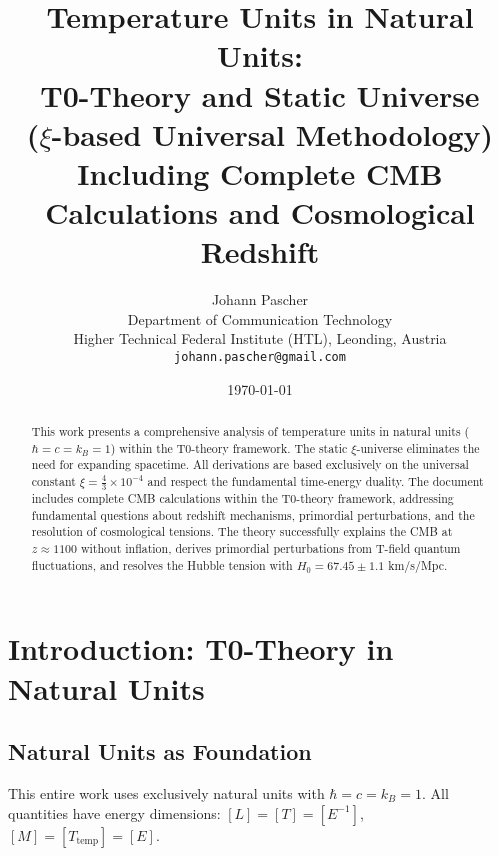 \documentclass[12pt,a4paper]{article}
\theoremstyle{definition}
\theoremstyle{remark}
\begin{document}
	
	\title{Temperature Units in Natural Units: \\
		T0-Theory and Static Universe \\
		($\xi$-based Universal Methodology)\\
		\large Including Complete CMB Calculations and Cosmological Redshift}
	\author{Johann Pascher\\
		Department of Communication Technology\\
		Higher Technical Federal Institute (HTL), Leonding, Austria\\
		\texttt{johann.pascher@gmail.com}}
	\date{\today}
	
	\maketitle
	
	\begin{abstract}
		This work presents a comprehensive analysis of temperature units in natural units ($\hbar = c = k_B = 1$) within the T0-theory framework. The static $\xi$-universe eliminates the need for expanding spacetime. All derivations are based exclusively on the universal constant $\xi = \frac{4}{3} \times 10^{-4}$ and respect the fundamental time-energy duality. The document includes complete CMB calculations within the T0-theory framework, addressing fundamental questions about redshift mechanisms, primordial perturbations, and the resolution of cosmological tensions. The theory successfully explains the CMB at $z \approx 1100$ without inflation, derives primordial perturbations from T-field quantum fluctuations, and resolves the Hubble tension with $H_0 = 67.45 \pm 1.1$ km/s/Mpc.
	\end{abstract}
	
	\tableofcontents
	\newpage
	
	\section{Introduction: T0-Theory in Natural Units}
	
	\subsection{Natural Units as Foundation}
	
	\begin{important}
		This entire work uses exclusively natural units with $\hbar = c = k_B = 1$. All quantities have energy dimensions: $[L] = [T] = [E^{-1}]$, $[M] = [T_{\text{temp}}] = [E]$.
	\end{important}
	
\end{document}

